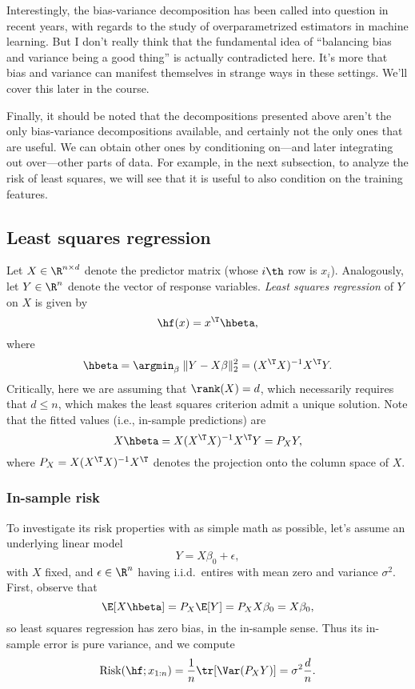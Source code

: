 \documentclass{article}
\begin{document}
Interestingly, the bias-variance decomposition has been called into question in
recent years, with regards to the study of overparametrized estimators in
machine learning. But I don't really think that the fundamental idea of 
``balancing bias and variance being a good thing'' is actually contradicted 
here. It's more that bias and variance can manifest themselves in strange ways
in these settings. We'll cover this later in the course. 

Finally, it should be noted that the decompositions presented above aren't the
only bias-variance decompositions available, and certainly not the only ones
that are useful. We can obtain other ones by conditioning on---and later
integrating out over---other parts of data. For example, in the next subsection,
to analyze the risk of least squares, we will see that it is useful to also
condition on the training features.

\subsection{Least squares regression}

Let $X \in \R^{n \times d}$ denote the predictor matrix (whose $i\th$ row is
$x_i$). Analogously, let $Y \in \R^n$ denote the vector of response
variables. \emph{Least squares regression} of $Y$ on $X$ is given by 
\[
\hf(x) = x^\T \hbeta,
\]
where 
\[
\hbeta = \argmin_\beta \; \|Y - X\beta\|_2^2 = (X^\T X)^{-1} X^\T Y.  
\]
Critically, here we are assuming that $\rank(X) = d$, which necessarily requires
that $d \leq n$, which makes the least squares criterion admit a unique
solution. Note that the fitted values (i.e., in-sample predictions) are 
\[
X\hbeta = X (X^\T X)^{-1} X^\T Y = P_X Y,
\]
where $P_X = X (X^\T X)^{-1} X^\T $ denotes the projection onto the column space
of $X$. 

\subsubsection{In-sample risk}

To investigate its risk properties with as simple math as possible, let's assume
an underlying linear model  
\begin{equation}
\label{eq:linear_model}
Y = X\beta_0 + \epsilon,
\end{equation}
with $X$ fixed, and $\epsilon \in \R^n$ having i.i.d.\ entires with mean zero
and variance $\sigma^2$. First, observe that   
\[
\E[X \hbeta] = P_X \E[Y] = P_X X \beta_0 = X \beta_0,
\]
so least squares regression has zero bias, in the in-sample sense. Thus its
in-sample error is pure variance, and we compute 
\begin{equation}
\label{eq:least_squares_in}
\Risk(\hf; x_{1:n}) = \frac{1}{n} \tr[\Var(P_X Y)] = \sigma^2 \frac{d}{n}.
\end{equation}
\end{document}
